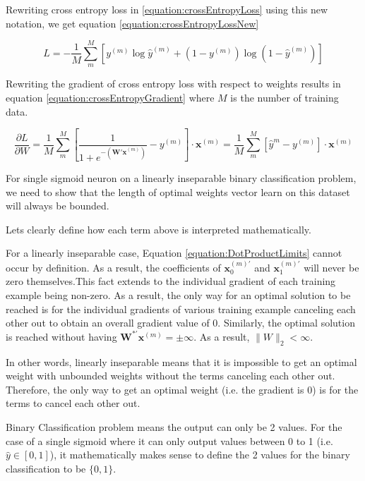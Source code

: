 \documentclass[a4paper,12pt]{article}
\begin{document}
Rewriting cross entropy loss in \ref{equation:crossEntropyLoss} using this new notation, we get equation \ref{equation:crossEntropyLossNew}

\begin{equation}
\label{equation:crossEntropyLossNew}
L = - \frac{1}{M} \sum_m^M [ y^{(m)} \log \hat{y}^{(m)} +
	(1 - y^{(m)} ) \log ( 1 - \hat{y}^{(m)} )]
\end{equation}

Rewriting the gradient of cross entropy loss with respect to weights results in equation \ref{equation:crossEntropyGradient} where $M$ is the number of training data. 

\begin{equation}
\label{equation:crossEntropyGradient}
\frac{\partial L}{\partial W} = \frac{1}{M} \sum_m^M [ \frac{1}{1 + e^{- (\mathbf{W'x}^{(m)})}} - y^{(m)} ] \cdot \mathbf{x}^{(m)} = \frac{1}{M} \sum_m^M [ \hat{y}^{m} - y^{(m)} ] \cdot \mathbf{x}^{(m)} 
\end{equation}

For single sigmoid neuron on a linearly inseparable binary classification problem, we need to show that the length of optimal weights vector learn on this dataset will always be bounded. 

Lets clearly define how each term above is interpreted mathematically. 

For a linearly inseparable case, Equation \ref{equation:DotProductLimits} cannot occur by definition. As a result, the coefficients of $\mathbf{x}_0^{(m)'}$ and $\mathbf{x}_1^{(m)'}$ will never be zero themselves.This fact extends to the individual gradient of each training example being non-zero. As a result, the only way for an optimal solution to be reached is for the individual gradients of various training example canceling each other out to obtain an overall gradient value of 0. Similarly, the optimal solution is reached without having $\mathbf{W}^{*'} \mathbf{x}^{(m)} = \pm \infty$. As a result, $\|W\|_2 < \infty$.

In other words, linearly inseparable means that it is impossible to get an optimal weight with  unbounded weights without the terms canceling each other out. Therefore, the only way to get an optimal weight (i.e. the gradient is 0) is for the terms to cancel each other out. 

Binary Classification problem means the output can only be 2 values. For the case of a single sigmoid where it can only output values between 0 to 1 (i.e. $\hat{y} \in [0, 1]$), it mathematically makes sense to define the 2 values for the binary classification to be $\{0, 1\}$. 
\end{document}
